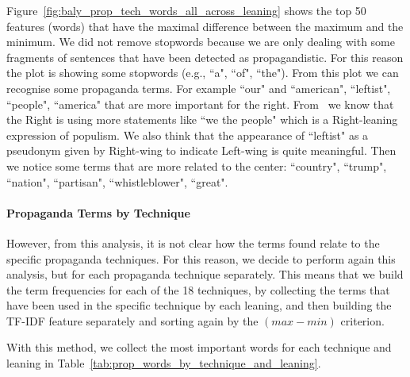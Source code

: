 Figure~\ref{fig:baly_prop_tech_words_all_across_leaning} shows the top 50 features (words) that have the maximal difference between the maximum and the minimum.
We did not remove stopwords because we are only dealing with some fragments of sentences that have been detected as propagandistic. For this reason the plot is showing some stopwords (e.g., ``a", ``of", ``the").
From this plot we can recognise some propaganda terms.
For example ``our" and ``american", ``leftist", ``people", ``america" that are more important for the right. From~\citet{seargeant2020art} we know that the Right is using more statements like ``we the people" which is a Right-leaning expression of populism. We also think that the appearance of ``leftist" as a pseudonym given by Right-wing to indicate Left-wing is quite meaningful.
Then we notice some terms that are more related to the center: ``country", ``trump", ``nation", ``partisan", ``whistleblower", ``great".

\paragraph{Propaganda Terms by Technique}
However, from this analysis, it is not clear how the terms found relate to the specific propaganda techniques. For this reason, we decide to perform again this analysis, but for each propaganda technique separately.
This means that we build the term frequencies for each of the 18 techniques, by collecting the terms that have been used in the specific technique by each leaning, and then building the TF-IDF feature separately and sorting again by the $(max - min)$ criterion.

With this method, we collect the most important words for each technique and leaning in Table~\ref{tab:prop_words_by_technique_and_leaning}.

